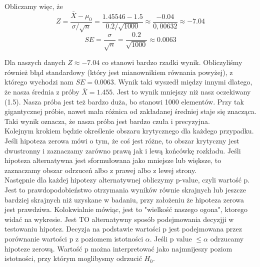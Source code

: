 \documentclass[12pt, a4paper]{article}
\begin{document}
		Obliczamy więc, że
		\begin{equation*}
			Z = \frac{\bar{X} - \mu_0}{\sigma / \sqrt{n}} = \frac{1.45546 - 1.5}{0.2/ \sqrt{1000}} \approx \frac{-0.04}{0,00632} \approx -7.04
		\end{equation*}
			\begin{equation*}
			SE = \frac{\sigma}{\sqrt{n}} = \frac{0.2}{\sqrt{1000}} \approx 0.0063
		\end{equation*}
		
		Dla naszych danych $Z \approx -7.04$ co stanowi bardzo rzadki wynik. Obliczyliśmy również błąd standardowy (który jest mianownikiem równania powyżej), z którego wychodzi nam $SE = 0.0063$. Wynik taki wyszedł między innymi dlatego, że nasza średnia z próby $\bar{X} = 1.455$. Jest to wynik mniejszy niż nasz oczekiwany (1.5). Nasza próba jest też bardzo duża, bo stanowi 1000 elementów.  Przy tak gigantycznej próbie, nawet mała różnica od zakładanej średniej staje się znacząca. Taki wynik oznacza, że nasza próba jest bardzo czuła i precyzyjna. \\
		
		Kolejnym krokiem będzie określenie obszaru krytycznego dla każdego przypadku. Jeśli hipoteza zerowa mówi o tym, że coś jest różne, to obszar krytyczny jest dwustronny i zaznaczamy zarówno prawą jak i lewą końcówkę rozkładu. Jeśli hipoteza alternatywna jest sformułowana jako mniejsze lub większe, to zaznaczamy obszar odrzuceń albo z prawej albo z lewej strony.\\
		
		Następnie dla każdej hipotezy alternatywnej obliczymy p-value, czyli wartość p. Jest to prawdopodobieństwo otrzymania wyników równie skrajnych lub jeszcze bardziej skrajnych niż uzyskane w badaniu, przy założeniu że hipoteza zerowa jest prawdziwa. Kolokwialnie mówiąc, jest to "wielkość naszego ogona", ktorego widać na wykresie. Jest TO alternatywny sposób podejmowania decyzjji w testowaniu hipotez.
		Decyzja na podstawie wartości p jest podejmowana przez porównanie wartości p z poziomem istotności $\alpha$. Jeśli p value $\leq \alpha $ odrzucamy hipoteze zerową. Wartość p można interpretować jako najmnijeszy poziom istotności, przy którym moglibysmy odrzucić $H_0$. \\
		
\end{document}
